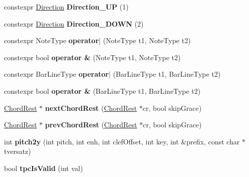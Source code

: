 \begin{DoxyCompactItemize}
constexpr \hyperlink{class_ms_1_1_direction}{Direction} {\bfseries Direction\+\_\+\+UP} (1)
\item 
\mbox{\label{namespace_ms_aa7f912adc80b6405e2e07e34641da06f}} 
constexpr \hyperlink{class_ms_1_1_direction}{Direction} {\bfseries Direction\+\_\+\+D\+O\+WN} (2)
\item 
\mbox{\label{namespace_ms_a7d18d6b9ea51bf024b0a66e28ae79901}} 
constexpr Note\+Type {\bfseries operator$\vert$} (Note\+Type t1, Note\+Type t2)
\item 
\mbox{\label{namespace_ms_a62f564c18dd516263a4d6a0f195153ac}} 
constexpr bool {\bfseries operator \&} (Note\+Type t1, Note\+Type t2)
\item 
\mbox{\label{namespace_ms_aa00bfb1a87fc49003be0466630041823}} 
constexpr Bar\+Line\+Type {\bfseries operator$\vert$} (Bar\+Line\+Type t1, Bar\+Line\+Type t2)
\item 
\mbox{\label{namespace_ms_ab1c0748e59061d5eae07b6f98bba2a03}} 
constexpr bool {\bfseries operator \&} (Bar\+Line\+Type t1, Bar\+Line\+Type t2)
\item 
\mbox{\label{namespace_ms_a60c3d8a61c63ab648c253442e51e804b}} 
\hyperlink{class_ms_1_1_chord_rest}{Chord\+Rest} $\ast$ {\bfseries next\+Chord\+Rest} (\hyperlink{class_ms_1_1_chord_rest}{Chord\+Rest} $\ast$cr, bool skip\+Grace)
\item 
\mbox{\label{namespace_ms_a05776eecab3e8f84c45f571328f47a14}} 
\hyperlink{class_ms_1_1_chord_rest}{Chord\+Rest} $\ast$ {\bfseries prev\+Chord\+Rest} (\hyperlink{class_ms_1_1_chord_rest}{Chord\+Rest} $\ast$cr, bool skip\+Grace)
\item 
\mbox{\label{namespace_ms_ae7ee0b3c06ae6b4ef40ad9cec82fd401}} 
int {\bfseries pitch2y} (int pitch, int enh, int clef\+Offset, int key, int \&prefix, const char $\ast$tversatz)
\item 
\mbox{\label{namespace_ms_aa05df67964ef42e7f460c97077c951f9}} 
bool {\bfseries tpc\+Is\+Valid} (int val)
\item 
\mbox{\label{namespace_ms_aac2df61458950cba6016f6fe123f9ec8}} 

\end{DoxyCompactItemize}
